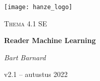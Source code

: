 \begin{titlepage}
	\centering
	\texttt{[image: hanze\_logo]}\par\vspace{1cm}
	\vspace{4cm}
	{\scshape\Large Thema 4.1 SE\par}
	\vspace{1.5cm}
	{\huge\bfseries Reader Machine Learning\par}
	\vspace{2cm}
	{\Large\itshape Bart Barnard\par}
	\vfill
	
	{\large v2.1 – autustus 2022\par}
\end{titlepage}

\tableofcontents
\newpage